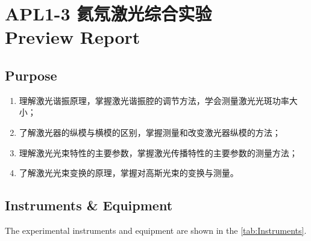 
\setcounter{section}{0}
\section{APL1-3 氦氖激光综合实验\\ Preview Report}


\subsection{Purpose}
\begin{enumerate}
	\item 理解激光谐振原理，掌握激光谐振腔的调节方法，学会测量激光光斑功率大小；
	\item 了解激光器的纵模与横模的区别，掌握测量和改变激光器纵模的方法；
	\item 理解激光光束特性的主要参数，掌握激光传播特性的主要参数的测量方法；
	\item 了解激光光束变换的原理，掌握对高斯光束的变换与测量。
\end{enumerate}


\subsection{Instruments \& Equipment}

The experimental instruments and equipment are shown in the \cref{tab:Instruments}.


